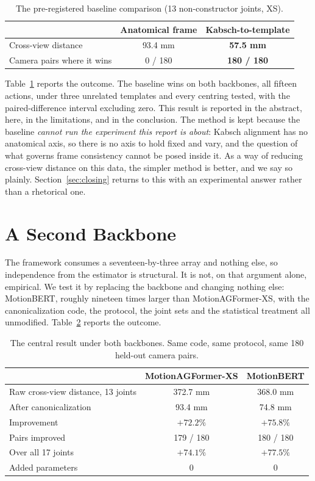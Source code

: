 \documentclass[12pt,a4paper]{report}
\begin{document}
\begin{table}[H]
\centering
\caption[The pre-registered baseline comparison]{The pre-registered baseline comparison (13 non-constructor joints, XS).}
\label{tab:template}
\begin{tabular}{lcc}
\toprule
 & \textbf{Anatomical frame} & \textbf{Kabsch-to-template} \\
\midrule
Cross-view distance & 93.4 mm & \textbf{57.5 mm} \\
Camera pairs where it wins & 0 / 180 & \textbf{180 / 180} \\
\bottomrule
\end{tabular}
\end{table}

Table~\ref{tab:template} reports the outcome. The baseline wins on both backbones, all fifteen actions, under three unrelated templates and every centring tested, with the paired-difference interval excluding zero. This result is reported in the abstract, here, in the limitations, and in the conclusion. The method is kept because the baseline \emph{cannot run the experiment this report is about}: Kabsch alignment has no anatomical axis, so there is no axis to hold fixed and vary, and the question of what governs frame consistency cannot be posed inside it. As a way of reducing cross-view distance on this data, the simpler method is better, and we say so plainly. Section~\ref{sec:closing} returns to this with an experimental answer rather than a rhetorical one.

\section{A Second Backbone}
\label{sec:backbone2}

The framework consumes a seventeen-by-three array and nothing else, so
independence from the estimator is structural. It is not, on that argument
alone, empirical. We test it by replacing the backbone and changing nothing
else: MotionBERT, roughly nineteen times larger than MotionAGFormer-XS, with the
canonicalization code, the protocol, the joint sets and the statistical
treatment all unmodified. Table~\ref{tab:backbone} reports the outcome.

\begin{table}[H]
\centering
\caption[The central result under both backbones]{The central result under both backbones. Same code, same protocol, same 180 held-out camera pairs.}
\label{tab:backbone}
\begin{tabular}{lcc}
\toprule
& MotionAGFormer-XS & MotionBERT \\
\midrule
Raw cross-view distance, 13 joints & 372.7 mm & 368.0 mm \\
After canonicalization & 93.4 mm & 74.8 mm \\
Improvement & $+72.2\%$ & $+75.8\%$ \\
Pairs improved & 179 / 180 & 180 / 180 \\
Over all 17 joints & $+74.1\%$ & $+77.5\%$ \\
Added parameters & 0 & 0 \\
\bottomrule
\end{tabular}
\end{table}
\end{document}
